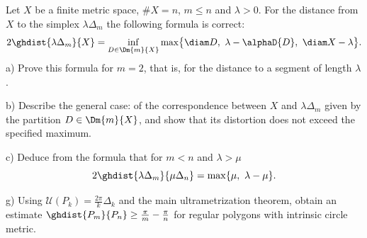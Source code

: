 \documentclass[a4paper,12pt]{report}
\begin{document}
\begin{task}
Let $X$ be a finite metric space, $\#X=n$, $m\le n$ and $\lambda>0$. For the distance from $X$ to the simplex $\lambda\Delta_m$ the following formula is correct:
\[
2\ghdist{\lambda\Delta_m}{X}=\inf_{D\in\Dm{m}{X}}\max\bigl\{\diam D,\ \lambda-\alphaD{D},\ \diam X-\lambda\bigr\}.
\]
\textup{a)} Prove this formula for $m=2$, that is, for the distance to a segment of length $\lambda$.

\textup{b)} Describe the general case\textup{:} of the correspondence between $X$ and $\lambda\Delta_m$ given by the partition $D\in\Dm{m}{X}$, and show that its distortion does not exceed the specified maximum.

\textup{c)} Deduce from the formula that for $m<n$ and $\lambda>\mu$
\[
2\ghdist{\lambda\Delta_m}{\mu\Delta_n}=\max\{\mu,\ \lambda-\mu\}.
\]

\textup{g)} Using $\mathcal U(P_k)=\frac{2\pi}{k}\Delta_k$ and the main ultrametrization theorem, obtain an estimate $\ghdist{P_m}{P_n}\ge\frac{\pi}{m}-\frac{\pi}{n}$ for regular polygons with intrinsic circle metric.

\end{task}
\end{document}

